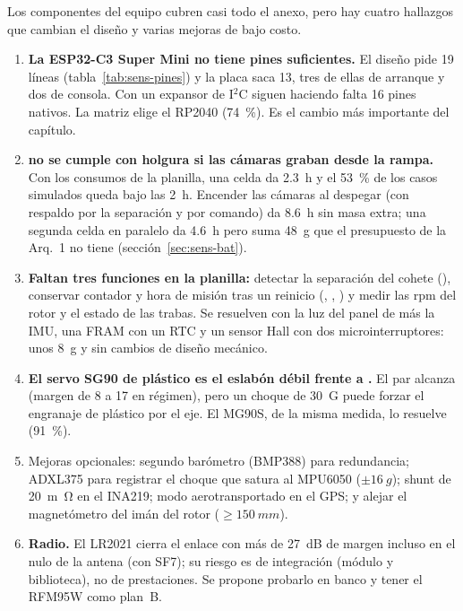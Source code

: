 \begin{resultado}
Los componentes del equipo cubren casi todo el anexo, pero hay cuatro hallazgos que cambian el
diseño y varias mejoras de bajo costo.
\begin{enumerate}[leftmargin=*]
  \item \textbf{La ESP32-C3 Super Mini no tiene pines suficientes.} El diseño pide 19 líneas
        (tabla~\ref{tab:sens-pines}) y la placa saca 13\nv, tres de ellas de arranque y dos de
        consola. Con un expansor de I$^2$C siguen haciendo falta 16 pines nativos. La matriz
        elige el RP2040 (\SI{74}{\percent}). Es el cambio más importante del capítulo.
  \item \textbf{ no se cumple con holgura si las cámaras graban desde la rampa.} Con los
        consumos de la planilla, una celda da \SI{2.3}{h} y el \SI{53}{\percent} de los casos
        simulados queda bajo las 2~h. Encender las cámaras al despegar (con respaldo por la
        separación y por comando) da \SI{8.6}{h} sin masa extra; una segunda celda en paralelo
        da \SI{4.6}{h} pero suma \SI{48}{g} que el presupuesto de la Arq.~1 no tiene
        (sección~\ref{sec:sens-bat}).
  \item \textbf{Faltan tres funciones en la planilla:} detectar la separación del cohete
        (), conservar contador y hora de misión tras un reinicio
        (, , ) y medir las rpm del rotor y el estado de las trabas. Se
        resuelven con la luz del panel de  más la IMU, una FRAM con un RTC y un sensor
        Hall con dos microinterruptores: unos \SI{8}{g} y sin cambios de diseño mecánico.
  \item \textbf{El servo SG90 de plástico es el eslabón débil frente a .} El par alcanza
        (margen de 8 a 17 en régimen), pero un choque de \SI{30}{G} puede forzar el engranaje
        de plástico por el eje. El MG90S, de la misma medida, lo resuelve (\SI{91}{\percent}).
  \item Mejoras opcionales: segundo barómetro (BMP388) para redundancia; ADXL375 para registrar
        el choque que satura al MPU6050 ($\pm\SI{16}{g}$); shunt de \SI{20}{m\ohm} en el INA219;
        modo aerotransportado en el GPS; y alejar el magnetómetro del imán del rotor
        ($\ge\SI{150}{mm}$).
  \item \textbf{Radio.} El LR2021 cierra el enlace con más de \SI{27}{dB} de margen incluso en el
        nulo de la antena (con SF7); su riesgo es de integración (módulo y biblioteca), no de
        prestaciones. Se propone probarlo en banco y tener el RFM95W como plan~B.
\end{enumerate}
\end{resultado}

